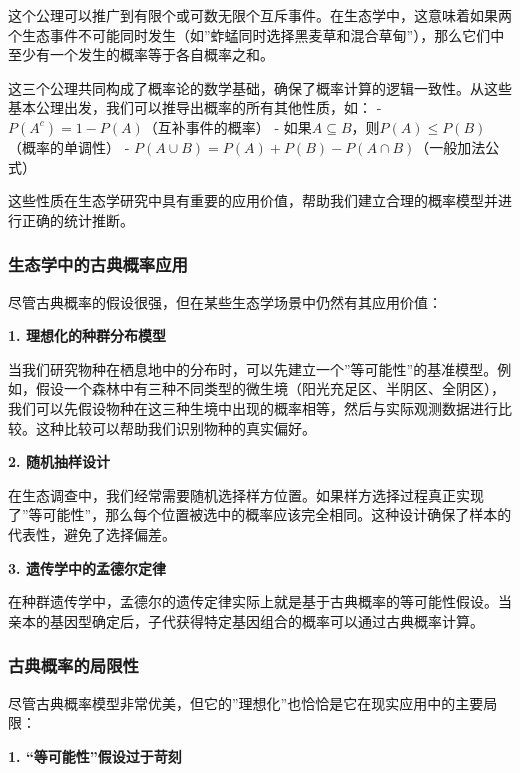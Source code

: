 \documentclass[
  twoside]{book}
\begin{document}
这个公理可以推广到有限个或可数无限个互斥事件。在生态学中，这意味着如果两个生态事件不可能同时发生（如''蚱蜢同时选择黑麦草和混合草甸''），那么它们中至少有一个发生的概率等于各自概率之和。

这三个公理共同构成了概率论的数学基础，确保了概率计算的逻辑一致性。从这些基本公理出发，我们可以推导出概率的所有其他性质，如：
- \(P(A^c) = 1 - P(A)\)（互补事件的概率）
- 如果\(A \subseteq B\)，则\(P(A) \leq P(B)\)（概率的单调性）
- \(P(A \cup B) = P(A) + P(B) - P(A \cap B)\)（一般加法公式）

这些性质在生态学研究中具有重要的应用价值，帮助我们建立合理的概率模型并进行正确的统计推断。

\hypertarget{ux751fux6001ux5b66ux4e2dux7684ux53e4ux5178ux6982ux7387ux5e94ux7528}{%
\subsubsection{生态学中的古典概率应用}\label{ux751fux6001ux5b66ux4e2dux7684ux53e4ux5178ux6982ux7387ux5e94ux7528}}

尽管古典概率的假设很强，但在某些生态学场景中仍然有其应用价值：

\textbf{1. 理想化的种群分布模型}

当我们研究物种在栖息地中的分布时，可以先建立一个''等可能性''的基准模型。例如，假设一个森林中有三种不同类型的微生境（阳光充足区、半阴区、全阴区），我们可以先假设物种在这三种生境中出现的概率相等，然后与实际观测数据进行比较。这种比较可以帮助我们识别物种的真实偏好。

\textbf{2. 随机抽样设计}

在生态调查中，我们经常需要随机选择样方位置。如果样方选择过程真正实现了''等可能性''，那么每个位置被选中的概率应该完全相同。这种设计确保了样本的代表性，避免了选择偏差。

\textbf{3. 遗传学中的孟德尔定律}

在种群遗传学中，孟德尔的遗传定律实际上就是基于古典概率的等可能性假设。当亲本的基因型确定后，子代获得特定基因组合的概率可以通过古典概率计算。

\hypertarget{ux53e4ux5178ux6982ux7387ux7684ux5c40ux9650ux6027}{%
\subsubsection{古典概率的局限性}\label{ux53e4ux5178ux6982ux7387ux7684ux5c40ux9650ux6027}}

尽管古典概率模型非常优美，但它的''理想化''也恰恰是它在现实应用中的主要局限：

\textbf{1. ``等可能性''假设过于苛刻}
\end{document}
